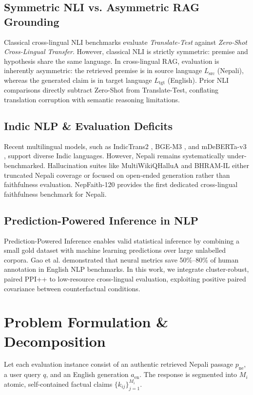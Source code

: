 \documentclass[conference]{IEEEtran}
\begin{document}
\subsection{Symmetric NLI vs. Asymmetric RAG Grounding}
Classical cross-lingual NLI benchmarks evaluate \textit{Translate-Test} against \textit{Zero-Shot Cross-Lingual Transfer}. However, classical NLI is strictly symmetric: premise and hypothesis share the same language. In cross-lingual RAG, evaluation is inherently asymmetric: the retrieved premise is in source language $L_{\text{src}}$ (Nepali), whereas the generated claim is in target language $L_{\text{tgt}}$ (English). Prior NLI comparisons directly subtract Zero-Shot from Translate-Test, conflating translation corruption with semantic reasoning limitations.

\subsection{Indic NLP \& Evaluation Deficits}
Recent multilingual models, such as IndicTrans2 \cite{gala2023indictrans2}, BGE-M3 \cite{chen2024bgem3}, and mDeBERTa-v3 \cite{laurer2022mdeberta}, support diverse Indic languages. However, Nepali remains systematically under-benchmarked. Hallucination suites like MultiWikiQHalluA and BHRAM-IL either truncated Nepali coverage or focused on open-ended generation rather than faithfulness evaluation. NepFaith-120 provides the first dedicated cross-lingual faithfulness benchmark for Nepali.

\subsection{Prediction-Powered Inference in NLP}
Prediction-Powered Inference \cite{angelopoulos2023ppi} enables valid statistical inference by combining a small gold dataset with machine learning predictions over large unlabelled corpora. Gao et al. \cite{gao2026ppsr} demonstrated that neural metrics save 50\%--80\% of human annotation in English NLP benchmarks. In this work, we integrate cluster-robust, paired PPI++ to low-resource cross-lingual evaluation, exploiting positive paired covariance between counterfactual conditions.

\section{Problem Formulation \& Decomposition}
\label{sec:formulation}
Let each evaluation instance consist of an authentic retrieved Nepali passage $p_{\text{ne}}$, a user query $q$, and an English generation $a_{\text{en}}$. The response is segmented into $M_i$ atomic, self-contained factual claims $\{k_{ij}\}_{j=1}^{M_i}$.
\end{document}

